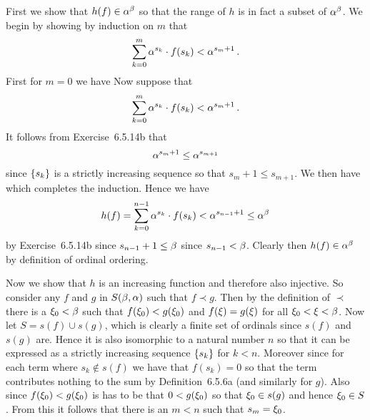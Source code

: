 {{    First we show that $h(f) \in \alpha^\beta$ so that the range of $h$ is in fact a subset of $\alpha^\beta$.
    We begin by showing by induction on $m$ that
    $$
    \sum_{k=0}^m \alpha^{s_k} \cdot f(s_k) < \alpha^{s_m + 1}  \,.
    $$
    First for $m=0$ we have
    Now suppose that
    $$
    \sum_{k=0}^m \alpha^{s_k} \cdot f(s_k) < \alpha^{s_m + 1} \,.
    $$
    It follows from Exercise~6.5.14b that
    $$
    \alpha^{s_m + 1} \leq \alpha^{s_{m+1}}
    $$
    since $\left\{ s_k \right\}$ is a strictly increasing sequence so that $s_m + 1 \leq s_{m+1}$.
    We then have
    which completes the induction.
    Hence we have
    $$
    h(f) = \sum_{k=0}^{n-1} \alpha^{s_k} \cdot f(s_k) < \alpha^{s_{n-1} + 1} \leq \alpha^\beta
    $$
    by Exercise~6.5.14b since $s_{n-1} + 1 \leq \beta$ since $s_{n-1} < \beta$.
    Clearly then $h(f) \in \alpha^\beta$ by definition of ordinal ordering.

    Now we show that $h$ is an increasing function and therefore also injective.
    So consider any $f$ and $g$ in $S(\beta, \alpha)$ such that $f \prec g$.
    Then by the definition of $\prec$ there is a $\xi_0 < \beta$ such that $f(\xi_0) < g(\xi_0)$ and $f(\xi) = g(\xi)$ for all $\xi_0 < \xi < \beta$.
    Now let $S = s(f) \cup  s(g)$, which is clearly a finite set of ordinals since $s(f)$ and $s(g)$ are.
    Hence it is also isomorphic to a natural number $n$ so that it can be expressed as a strictly increasing sequence $\left\{ s_k \right\}$ for $k < n$.
    Moreover
    since for each term where $s_k \notin s(f)$ we have that $f(s_k) = 0$ so that the term contributes nothing to the sum by Definition~6.5.6a (and similarly for $g$).
    Also since $f(\xi_0) < g(\xi_0)$ is has to be that $0 < g(\xi_0)$ so that $\xi_0 \in s(g)$ and hence $\xi_0 \in S$.
    From this it follows that there is an $m < n$ such that $s_m = \xi_0$.

}}
